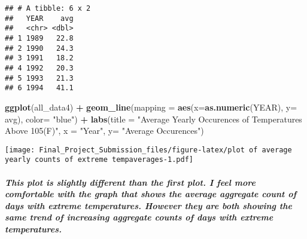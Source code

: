 \documentclass[]{article}
\newenvironment{Shaded}{\begin{snugshade}}{\end{snugshade}}
\newcommand{\DataTypeTok}[1]{\textcolor[rgb]{0.13,0.29,0.53}{#1}}
\newcommand{\DecValTok}[1]{\textcolor[rgb]{0.00,0.00,0.81}{#1}}
\newcommand{\KeywordTok}[1]{\textcolor[rgb]{0.13,0.29,0.53}{\textbf{#1}}}
\newcommand{\NormalTok}[1]{#1}
\newcommand{\OperatorTok}[1]{\textcolor[rgb]{0.81,0.36,0.00}{\textbf{#1}}}
\newcommand{\StringTok}[1]{\textcolor[rgb]{0.31,0.60,0.02}{#1}}
\let\oldsubparagraph\subparagraph
\renewcommand{\subparagraph}[1]{\oldsubparagraph{#1}\mbox{}}
\begin{document}
\begin{Shaded}
\end{Shaded}

\begin{verbatim}
## # A tibble: 6 x 2
##   YEAR    avg
##   <chr> <dbl>
## 1 1989   22.8
## 2 1990   24.3
## 3 1991   18.2
## 4 1992   20.3
## 5 1993   21.3
## 6 1994   41.1
\end{verbatim}

\begin{Shaded}
\begin{Highlighting}[]
\KeywordTok{ggplot}\NormalTok{(all_data4) }\OperatorTok{+}
\StringTok{  }\KeywordTok{geom_line}\NormalTok{(}\DataTypeTok{mapping =} \KeywordTok{aes}\NormalTok{(}\DataTypeTok{x=}\KeywordTok{as.numeric}\NormalTok{(YEAR), }\DataTypeTok{y=}\NormalTok{ avg), }\DataTypeTok{color=} \StringTok{"blue"}\NormalTok{) }\OperatorTok{+}
\StringTok{  }\KeywordTok{labs}\NormalTok{(}\DataTypeTok{title =} \StringTok{"Average Yearly Occurences of Temperatures Above 105(F)"}\NormalTok{, }\DataTypeTok{x =} \StringTok{"Year"}\NormalTok{, }\DataTypeTok{y=} \StringTok{"Average Occurences"}\NormalTok{)}
\end{Highlighting}
\end{Shaded}

\texttt{[image: Final\_Project\_Submission\_files/figure-latex/plot of average yearly counts of extreme tempaverages-1.pdf]}

\hypertarget{this-plot-is-slightly-different-than-the-first-plot.-i-feel-more-comfortable-with-the-graph-that-shows-the-average-aggregate-count-of-days-with-extreme-temperatures.-however-they-are-both-showing-the-same-trend-of-increasing-aggregate-counts-of-days-with-extreme-temperatures.}{%
\subparagraph{This plot is slightly different than the first plot. I
feel more comfortable with the graph that shows the average aggregate
count of days with extreme temperatures. However they are both showing
the same trend of increasing aggregate counts of days with extreme
temperatures.}\label{this-plot-is-slightly-different-than-the-first-plot.-i-feel-more-comfortable-with-the-graph-that-shows-the-average-aggregate-count-of-days-with-extreme-temperatures.-however-they-are-both-showing-the-same-trend-of-increasing-aggregate-counts-of-days-with-extreme-temperatures.}}
\end{document}
